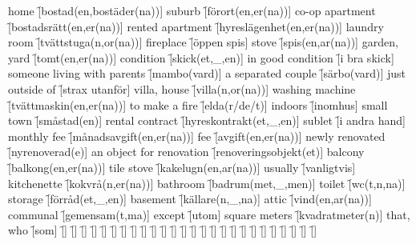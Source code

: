 \begin{questions}
    \begin{multicols}{2}
        \raggedcolumns
        \question home \f[bostad(en,bostäder(na))]
        \question suburb \f[förort(en,er(na))]
        \question co-op apartment \f[bostadsrätt(en,er(na))]
        \question rented apartment \f[hyreslägenhet(en,er(na))]
        \question laundry room \f[tvättstuga(n,or(na))]
        \question fireplace \f[öppen spis]
        \question stove \f[spis(en,ar(na))]
        \question garden, yard \f[tomt(en,er(na))]
        \question condition \f[skick(et,\_,en)]
        \question in good condition \f[i bra skick]
        \question someone living with parents \f[mambo(vard)]
        \question a separated couple \f[särbo(vard)]
        \question just outside of \f[strax utanför]
        \question villa, house \f[villa(n,or(na))]
        \question washing machine \f[tvättmaskin(en,er(na))]
        \question to make a fire \f[elda(r/de/t)]
        \question indoors \f[inomhus]
        \question small town \f[småstad(en)]
        \question rental contract \f[hyreskontrakt(et,\_,en)]
        \question sublet \f[i andra hand]
        \question monthly fee \f[månadsavgift(en,er(na))]
        \question fee \f[avgift(en,er(na))]
        \question newly renovated \f[nyrenoverad(e)]
        \question an object for renovation \f[renoveringsobjekt(et)]
        \question balcony \f[balkong(en,er(na))]
        \question tile stove \f[kakelugn(en,ar(na))]
        \question usually \f[vanligtvis]
        \question kitchenette \f[kokvrå(n,er(na))]
        \question bathroom \f[badrum(met,\_,men)]
        \question toilet \f[wc(t,n,na)]
        \question storage \f[förråd(et,\_,en)]
        \question basement \f[källare(n,\_,na)]
        \question attic \f[vind(en,ar(na))]
        \question communal \f[gemensam(t,ma)]
        \question except \f[utom]
        \question square meters \f[kvadratmeter(n)]
        \question that, who \f[som]
        \question  \f[]
        \question  \f[]
        \question  \f[]
        \question  \f[]
        \question  \f[]
        \question  \f[]
        \question  \f[]
        \question  \f[]
        \question  \f[]
        \question  \f[]
        \question  \f[]
        \question  \f[]
        \question  \f[]
        \question  \f[]
        \question  \f[]
        \question  \f[]
        \question  \f[]
        \question  \f[]
        \question  \f[]
        \question  \f[]
        \question  \f[]
        \question  \f[]
        \question  \f[]
        \question  \f[]
        \question  \f[]
        \question  \f[]

\end{multicols}
\end{questions}
